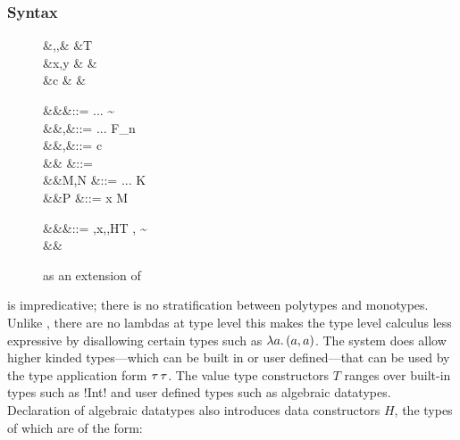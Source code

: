 \documentclass[manuscript,screen,nonacm]{acmart}
\begin{document}



\subsubsection{Syntax}
\begin{figure}[ht]
  \centering
  \begin{syntax}
     &\alpha,\beta,\gamma  & &T \\
     &x,y                  & & \\
     &c & &
  \end{syntax}
  \begin{syntax}
         &&\kappa       &::= ... \mid \sigma \sim \tau\\
         &&\tau,\sigma  &::= ... \mid F_n\\
     &&\nu,\Co      &::= c \mid {}\tau \mid \sym\Co \mid \trans\nu\Co %
                                        \mid \Forall {\alpha\co\kappa} \Co \mid \Co\At\tau %
                                        \mid \nu\App\Co \mid \left \Co \mid \right \Co \\  %
     && \phi &::= \tau \mid \Co\\
         &&M,N  &::= ... \mid \Case K  \mid \Cast \Tm \Co\\
      &&P    &::= x \to M
    \end{syntax}
    \begin{syntax}
     &&\TEnv &::= \empt \mid \TEnv,x\co\tau \mid \TEnv,\alpha\co\kappa \mid \TEnv,H\co T \mid \TEnv, \gamma \co \tau\sim\sigma\\
      &&\Subst
    \end{syntax}
  \caption{\SFC as an extension of \SF}
  \label{fig:system-fc-syntax}
\end{figure}
\SFC is impredicative; there is no stratification between polytypes and monotypes. Unlike \SFw, there are no lambdas at type level this makes the type level calculus less expressive by disallowing certain types such as $\lambda a.\, (a, a)$. The system does allow higher kinded types---which can be built in or user defined---that can be used by the type application form $\tau\,\tau$.  The value type constructors $T$ ranges over built-in types such as !Int! and user defined types such as algebraic datatypes. Declaration of algebraic datatypes also introduces data constructors $H$, the types of which are of the form:
\end{document}

